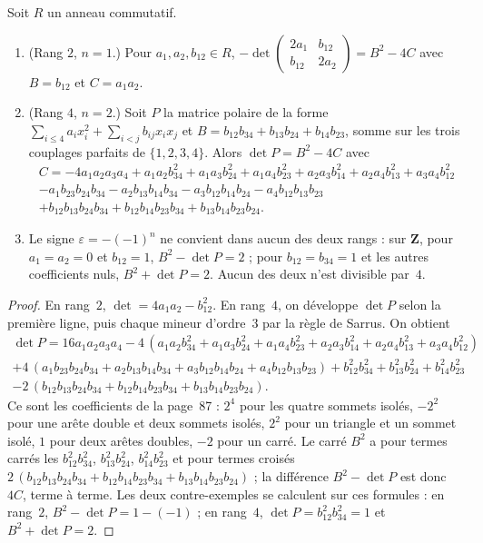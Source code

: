\begin{enonce}
Soit $R$ un anneau commutatif.
\begin{enumerate}
\item (Rang $2$, $n = 1$.) Pour $a_1, a_2, b_{12} \in R$, $-\det\begin{pmatrix} 2a_1 & b_{12} \\ b_{12} & 2a_2\end{pmatrix} = B^2 - 4C$ avec $B = b_{12}$ et $C = a_1a_2$.
\item (Rang $4$, $n = 2$.) Soit $P$ la matrice polaire de la forme $\sum_{i \leq 4} a_i x_i^2 + \sum_{i<j} b_{ij} x_i x_j$ et $B = b_{12}b_{34} + b_{13}b_{24} + b_{14}b_{23}$, somme sur les trois couplages parfaits de $\{1, 2, 3, 4\}$. Alors $\det P = B^2 - 4C$ avec
\begin{multline*}
C = -4a_1a_2a_3a_4 + a_1a_2b_{34}^2 + a_1a_3b_{24}^2 + a_1a_4b_{23}^2 + a_2a_3b_{14}^2 + a_2a_4b_{13}^2 + a_3a_4b_{12}^2 \\
- a_1b_{23}b_{24}b_{34} - a_2b_{13}b_{14}b_{34} - a_3b_{12}b_{14}b_{24} - a_4b_{12}b_{13}b_{23} \\
+ b_{12}b_{13}b_{24}b_{34} + b_{12}b_{14}b_{23}b_{34} + b_{13}b_{14}b_{23}b_{24}.
\end{multline*}
\item Le signe $\varepsilon = -(-1)^n$ ne convient dans aucun des deux rangs : sur $\mathbf Z$, pour $a_1 = a_2 = 0$ et $b_{12} = 1$, $B^2 - \det P = 2$ ; pour $b_{12} = b_{34} = 1$ et les autres coefficients nuls, $B^2 + \det P = 2$. Aucun des deux n'est divisible par~$4$.
\end{enumerate}
\end{enonce}

\begin{proof}
En rang~$2$, $\det = 4a_1a_2 - b_{12}^2$. En rang~$4$, on développe $\det P$ selon la première ligne, puis chaque mineur d'ordre~$3$ par la règle de Sarrus. On obtient
\begin{multline*}
\det P = 16a_1a_2a_3a_4 - 4\,(a_1a_2b_{34}^2 + a_1a_3b_{24}^2 + a_1a_4b_{23}^2 + a_2a_3b_{14}^2 + a_2a_4b_{13}^2 + a_3a_4b_{12}^2) \\
+ 4\,(a_1b_{23}b_{24}b_{34} + a_2b_{13}b_{14}b_{34} + a_3b_{12}b_{14}b_{24} + a_4b_{12}b_{13}b_{23}) + b_{12}^2b_{34}^2 + b_{13}^2b_{24}^2 + b_{14}^2b_{23}^2 \\
- 2\,(b_{12}b_{13}b_{24}b_{34} + b_{12}b_{14}b_{23}b_{34} + b_{13}b_{14}b_{23}b_{24}).
\end{multline*}
Ce sont les coefficients de la page~87 : $2^4$ pour les quatre sommets isolés, $-2^2$ pour une arête double et deux sommets isolés, $2^2$ pour un triangle et un sommet isolé, $1$ pour deux arêtes doubles, $-2$ pour un carré. Le carré $B^2$ a pour termes carrés les $b_{12}^2b_{34}^2$, $b_{13}^2b_{24}^2$, $b_{14}^2b_{23}^2$ et pour termes croisés $2\,(b_{12}b_{13}b_{24}b_{34} + b_{12}b_{14}b_{23}b_{34} + b_{13}b_{14}b_{23}b_{24})$ ; la différence $B^2 - \det P$ est donc $4C$, terme à terme. Les deux contre-exemples se calculent sur ces formules : en rang~$2$, $B^2 - \det P = 1 - (-1)$ ; en rang~$4$, $\det P = b_{12}^2b_{34}^2 = 1$ et $B^2 + \det P = 2$.
\end{proof}

